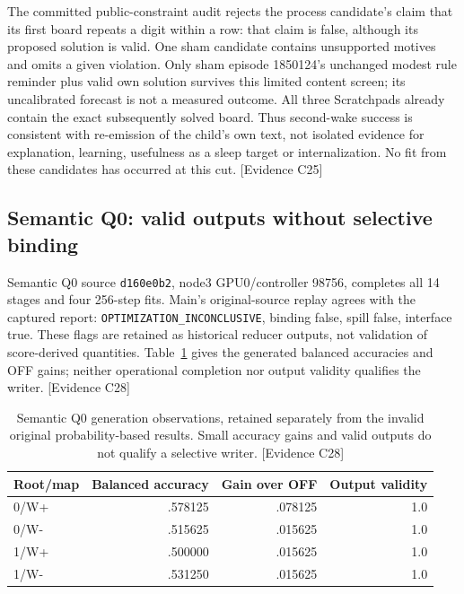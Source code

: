 \documentclass[11pt]{article}
\newcommand{\ev}[1]{\textsf{[Evidence #1]}}
\begin{document}
The committed public-constraint audit rejects the process candidate's claim
that its first board repeats a digit within a row: that claim is false, although
its proposed solution is valid. One sham candidate contains unsupported motives
and omits a given violation. Only sham episode 1850124's unchanged modest rule
reminder plus valid own solution survives this limited content screen; its
uncalibrated forecast is not a measured outcome. All three Scratchpads already
contain the exact subsequently solved board. Thus second-wake success is
consistent with re-emission of the child's own text, not isolated evidence for
explanation, learning, usefulness as a sleep target or internalization. No fit
from these candidates has occurred at this cut. \ev{C25}

\subsection{Semantic Q0: valid outputs without selective binding}
Semantic Q0 source \texttt{d160e0b2}, node3 GPU0/controller 98756, completes all
14 stages and four 256-step fits. Main's original-source replay agrees with the
captured report: \texttt{OPTIMIZATION\_INCONCLUSIVE}, binding false, spill false,
interface true. These flags are retained as historical reducer outputs, not
validation of score-derived quantities. Table~\ref{tab:semanticq0} gives the generated balanced accuracies
and OFF gains; neither operational completion nor output validity qualifies
the writer. \ev{C28}

\begin{table}[ht]
\centering
\begin{tabular}{lrrr}
\toprule
Root/map & Balanced accuracy & Gain over OFF & Output validity \\
\midrule
0/W+ & .578125 & .078125 & 1.0 \\
0/W- & .515625 & .015625 & 1.0 \\
1/W+ & .500000 & .015625 & 1.0 \\
1/W- & .531250 & .015625 & 1.0 \\
\bottomrule
\end{tabular}
\caption{Semantic Q0 generation observations, retained separately from the
invalid original probability-based results. Small accuracy gains and valid
outputs do not qualify a selective writer. \ev{C28}}
\label{tab:semanticq0}
\end{table}
\end{document}
